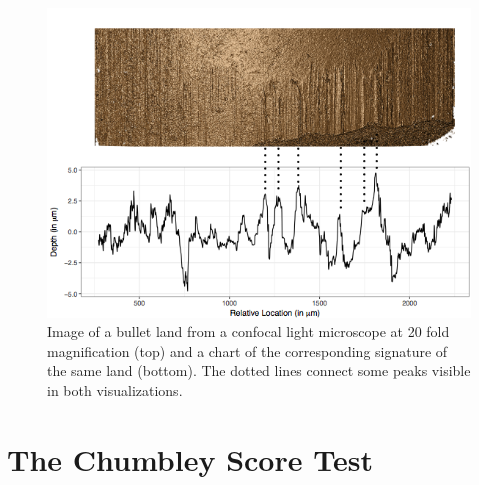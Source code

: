\documentclass[12pt]{article}
\begin{document}

\begin{figure}
\centering
\includegraphics[width=\textwidth]{images/B6-B2-L6-rescaled.png}


\caption{\label{fig:rgl} Image of a bullet land from a confocal light microscope at 20 fold magnification (top) and a chart of the corresponding signature of the same land (bottom). The dotted lines connect some peaks visible in both visualizations.}

\end{figure}

\section{The Chumbley Score Test}\label{the-chumbley-score-test}
\end{document}
